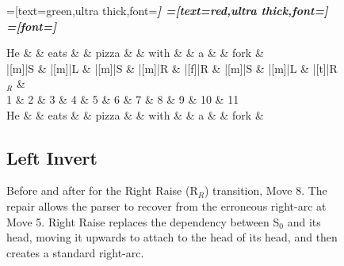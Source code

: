 \documentclass[11pt,letterpaper]{article}
\newcommand{\stacktop}{S$_0$\xspace}
\begin{document}
\begin{figure}
\begin{dependency}[theme=simple]
=[text=green,ultra thick,font=\bfseries\itshape]
=[text=red,ultra thick,font=\bfseries\itshape]
=[font=\bfseries\itshape]

\begin{deptext}[column sep=.1cm, row sep=.1ex]
    He \&   \& eats \&     \& pizza  \&        \& with  \&       \& a \& \& fork \& \\
|[m]|S \& |[m]|L \& |[m]|S \& |[m]|R \& |[f]|R \& |[m]|S \& |[m]|L \& |[t]|R$_R$ \& \\
1      \& 2 \&  3   \& 4   \&   5    \& 6      \&  7    \& 8     \&     9 \& 10 \& 11 \\
He \&   \& eats \&     \& pizza  \&        \& with  \&       \& a \& \& fork \& \\
\end{deptext}
\end{dependency}
\caption{Before and after for the Right Raise (R$_R$) transition,
         Move 8. The repair allows the parser to recover from the erroneous right-arc
         at Move 5. Right Raise replaces the dependency between \stacktop and its head,
         moving it upwards to attach to the head of its head, and then creates 
         a standard right-arc.
     \label{fig:with_fork}}

\subsection{Left Invert}

\end{figure}
\end{document}
